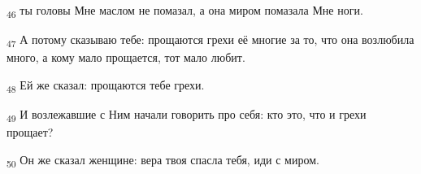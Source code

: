 \begin{tcolorbox}
\textsubscript{46} ты головы Мне маслом не помазал, а она миром помазала Мне ноги.
\end{tcolorbox}
\begin{tcolorbox}
\textsubscript{47} А потому сказываю тебе: прощаются грехи её многие за то, что она возлюбила много, а кому мало прощается, тот мало любит.
\end{tcolorbox}
\begin{tcolorbox}
\textsubscript{48} Ей же сказал: прощаются тебе грехи.
\end{tcolorbox}
\begin{tcolorbox}
\textsubscript{49} И возлежавшие с Ним начали говорить про себя: кто это, что и грехи прощает?
\end{tcolorbox}
\begin{tcolorbox}
\textsubscript{50} Он же сказал женщине: вера твоя спасла тебя, иди с миром.
\end{tcolorbox}
